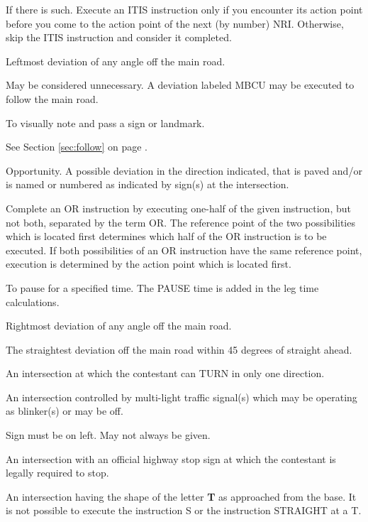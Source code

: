 If there is such.  Execute an ITIS instruction only if you encounter its action point before you come to the action point of the next (by number) NRI.  Otherwise, skip the ITIS instruction and consider it completed.

Leftmost deviation of any angle off the main road.

May be considered unnecessary.  A deviation labeled MBCU may be executed to follow the main road.

To visually note and pass a sign or landmark.

See Section \ref{sec:follow} on page \pageref{sec:follow}.

Opportunity.  A possible deviation in the direction indicated, that is paved and/or is named or numbered as indicated by sign(s) at the intersection.

Complete an OR instruction by executing one-half of the given instruction, but not both, separated by the term OR.  The reference point of the two possibilities which is located first determines which half of the OR instruction is to be executed.  If both possibilities of an OR instruction have the same reference point, execution is determined by the action point which is located first.

To pause for a specified time.  The PAUSE time is added in the leg time calculations.

Rightmost deviation of any angle off the main road.

The straightest deviation off the main road within 45 degrees of straight ahead.

An intersection at which the contestant can TURN in only one direction.

An intersection controlled by multi-light traffic signal(s) which may be operating as blinker(s) or may be off.

Sign must be on left.  May not always be given.

An intersection with an official highway stop sign at which the contestant is legally required to stop.

An intersection having the shape of the letter \textbf{T} as approached from the base.  It is not possible to execute the instruction S or the instruction STRAIGHT at a T.


